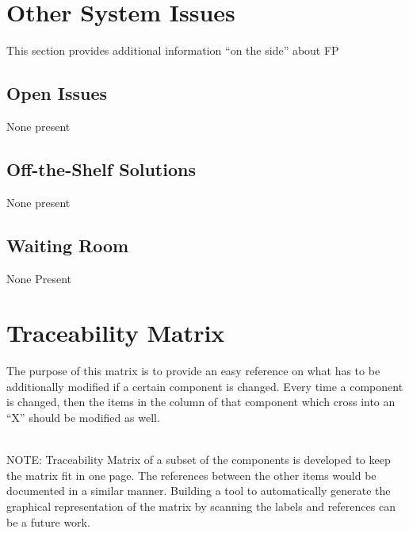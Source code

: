 \section{Other System Issues}

This section provides additional information ``on the side'' about FP

\subsection{Open Issues}

None present

\subsection{ Off-the-Shelf Solutions}
   
None present

\subsection{ Waiting Room}

None Present

\section{Traceability Matrix}

The purpose of this matrix is to provide an easy reference on what has to be
additionally modified if a certain component is changed. Every time a component
is changed, then the items in the column of that component which cross into an
``X'' should be modified as well.
\\
~\newline

NOTE: Traceability Matrix of a subset of the components is developed to keep the
matrix fit in one page. The references between the other items would be
documented in a similar manner. Building a tool to automatically generate the
graphical representation of the matrix by scanning the labels and references can
be a future work.
\\
~\newline

